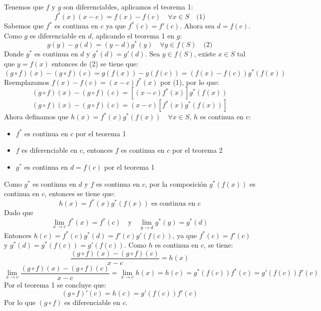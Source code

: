 \begin{prueba}
    Tenemos que $f$ y $g$ son diferenciables, aplicamos el teorema 1:
\[f^*(x)(x-c) = f(x)-f(c) \quad \forall x \in S \quad \text{(1)}\]
Sabemos que $f^*$ es continua en $c$ ya que $f^*(c) = f'(c)$.
Ahora sea $d = f(c)$. Como $g$ es diferenciable en $d$, aplicando el teorema 1 en $g$:
\[g(y) - g(d) = (y-d) g^*(y) \quad \forall y \in f(S) \quad \text{(2)}\]
Donde $g^*$ es continua en $d$ y $g^*(d) = g'(d)$.
Sea $y \in f(S)$, existe $x \in S$ tal que $y = f(x)$ entonces de (2) se tiene que:
\[(g \circ f)(x) - (g \circ f)(c) = g(f(x)) - g(f(c)) = (f(x) - f(c)) g^*(f(x))\]
Reemplazamos $f(x) - f(c) = (x-c) f^*(x)$ por (1), por lo que:
\[(g \circ f)(x) - (g \circ f)(c) = [(x-c) f^*(x)] g^*(f(x))\]
\[(g \circ f)(x) - (g \circ f)(c) = (x-c) [f^*(x) g^*(f(x))]\]
Ahora definamos que $h(x) = f^*(x) g^*(f(x)) \quad \forall x \in S$, $h$ es continua en $c$:

\begin{itemize}
    \item $f^*$ es continua en $c$ por el teorema 1
    
    \item $f$ es diferenciable en $c$, entonces $f$ es continua en $c$ por el teorema 2
    
    \item $g^*$ es continua en $d = f(c)$ por el teorema 1
\end{itemize}

Como $g^*$ es continua en $d$ y $f$ es continua en $c$, por la composición $g^*(f(x))$ es continua en $c$, entonces se tiene que:
\[h(x) = f^*(x) g^*(f(x)) \text{ es continua en } c\]
Dado que
\[\lim_{x \to c} f^*(x) = f^*(c) \quad \text{y} \quad \lim_{y \to d} g^*(y) = g^*(d)\]
Entonces $h(c) = f^*(c)g^*(d) = f'(c)g'(f(c))$, ya que $f^*(c) = f'(c)$ y $g^*(d) = g^*(f(c)) = g'(f(c))$.
Como $h$ es continua en $c$, se tiene:
\[\frac{(g \circ f)(x) - (g \circ f)(c)}{x - c} = h(x)\]
\[\lim_{x \to c} \frac{(g \circ f)(x) - (g \circ f)(c)}{x - c} = \lim_{x \to c} h(x) = h(c) = g^*(f(c)) f^*(c) = g'(f(c)) f'(c)\]
Por el teorema 1 se concluye que:
\[(g \circ f)'(c) = h(c) = g'(f(c)) f'(c)\]
Por lo que $(g \circ f)$ es diferenciable en $c$.

\end{prueba}

